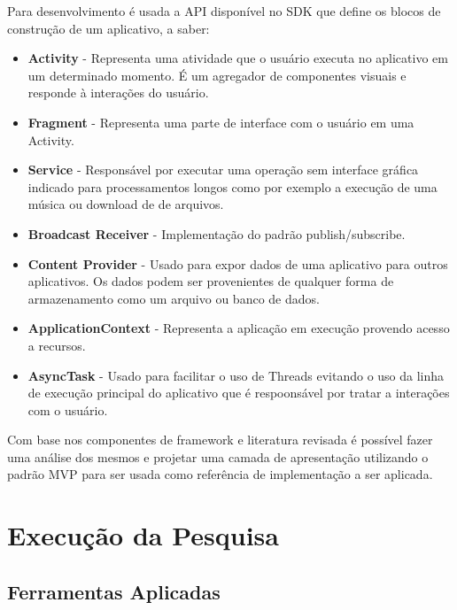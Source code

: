 \documentclass[conference]{IEEEtran}
\begin{document}

Para desenvolvimento é usada a API disponível no SDK que define
os blocos de construção de um aplicativo, a saber:

\begin{itemize}
  \item \textbf{Activity} - Representa uma atividade que o usuário executa no
  aplicativo em um determinado momento. É um agregador de componentes visuais e responde à
  interações do usuário.
  \item \textbf{Fragment} - Representa uma parte de interface com o usuário
  em uma Activity.
  \item \textbf{Service} -  Responsável por executar uma operação sem interface
  gráfica indicado para processamentos longos como por exemplo a execução de uma música
  ou download de de arquivos.
  \item \textbf{Broadcast Receiver} - Implementação do padrão
  publish/subscribe.
  \item \textbf{Content Provider} - Usado para expor dados de
  uma aplicativo para outros aplicativos. Os dados podem ser provenientes de qualquer forma de
  armazenamento como um arquivo ou banco de dados.
  \item \textbf{ApplicationContext} - Representa a aplicação em execução
  provendo acesso a recursos.
  \item \textbf{AsyncTask} - Usado para facilitar o uso de Threads evitando o
  uso da linha de execução principal do aplicativo que é respoonsável por tratar a
  interações com o usuário.
  
\end{itemize}


Com base nos componentes de framework e literatura revisada é possível fazer
uma análise dos mesmos e projetar uma camada de apresentação utilizando o padrão
MVP para ser usada como referência de implementação a ser aplicada.

\section{Execução da Pesquisa}


\subsection{Ferramentas Aplicadas}
\end{document}
